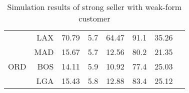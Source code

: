 \begin{table}[h]
\begin{center}
\begin{tabular}{l r c c c c c c}
     &  LAX &   70.79  &     5.7  &   64.47  &    91.1  &   35.26  \\
     &  MAD &   15.67  &     5.7  &   12.56  &    80.2  &   21.35  \\[.5ex]
ORD  &  BOS &   14.11  &     5.9  &   10.92  &    77.4  &   25.03  \\
     &  LGA &   15.43  &     5.8  &   12.88  &    83.4  &   25.12  \\
            \bottomrule
        \end{tabular}
        \caption{Simulation results of strong seller with weak-form customer}
        \label{tbl:resultsStrongWeak}
    \end{center}
\end{table}

